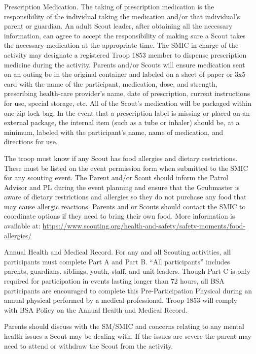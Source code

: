 \documentclass{ltxguide}
\begin{document}
Prescription Medication. The taking of prescription medication is the responsibility of the individual taking the medication and/or that individual's parent or guardian. An adult Scout leader, after obtaining all the necessary information, can agree to accept the responsibility of making sure a Scout takes the necessary medication at the appropriate time. The SMIC in charge of the activity may designate a registered Troop 1853 member to dispense prescription medicine during the activity. Parents and/or Scouts will ensure medication sent on an outing be in the original container and labeled on a sheet of paper or 3x5 card with the name of the participant, medication, dose, and strength, prescribing health-care provider's name, date of prescription, current instructions for use, special storage, etc. All of the Scout's medication will be packaged within one zip lock bag. In the event that a prescription label is missing or placed on an external package, the internal item (such as a tube or inhaler) should be, at a minimum, labeled with the participant's name, name of medication, and directions for use.

The troop must know if any Scout has food allergies and dietary restrictions. These must be listed on the event permission form when submitted to the SMIC for any scouting event. The Parent and/or Scout should inform the Patrol Advisor and \ac{PL} during the event planning and ensure that the Grubmaster is aware of dietary restrictions and allergies so they do not purchase any food that may cause allergic reactions. Parents and or Scouts should contact the SMIC to coordinate options if they need to bring their own food. More information is available at:
\url{https://www.scouting.org/health-and-safety/safety-moments/food-allergies/}

Annual Health and Medical Record. For any and all Scouting activities, all participants must complete Part A and Part B. “All participants” includes parents, guardians, siblings, youth, staff, and unit leaders. Though Part C is only required for participation in events lasting longer than 72 hours, all \ac{BSA} participants are encouraged to complete this Pre-Participation Physical during an annual physical performed by a medical professional. Troop 1853 will comply with \ac{BSA} Policy on the Annual Health and Medical Record.

Parents should discuss with the SM/SMIC and concerns relating to any mental health issues a Scout may be dealing with. If the issues are severe the parent may need to attend or withdraw the Scout from the activity.
\end{document}
